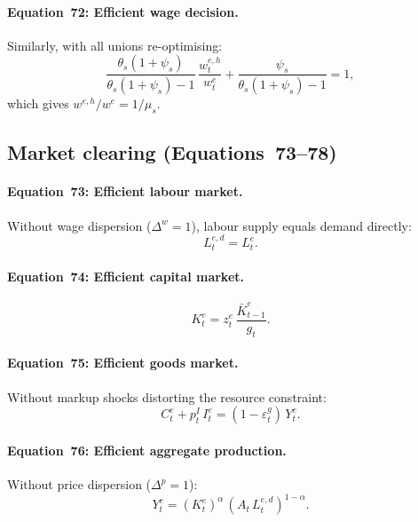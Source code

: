 \documentclass[11pt,a4paper]{article}
\newcommand{\bbar}[1]{\bar{#1}}
\begin{document}
\paragraph{Equation~72: Efficient wage decision.}
Similarly, with all unions re-optimising:
\begin{equation}\tag{Eq.~72}
  \frac{\theta_s(1+\psi_s)}{\theta_s(1+\psi_s)-1}\,
  \frac{w^{e,h}_t}{w^e_t}
  + \frac{\psi_s}{\theta_s(1+\psi_s)-1}
  = 1,
\end{equation}
which gives $w^{e,h}/w^e = 1/\mu_s$.

\subsection{Market clearing (Equations~73--78)}

\paragraph{Equation~73: Efficient labour market.}
Without wage dispersion ($\Delta^w = 1$), labour supply equals demand directly:
\begin{equation}\tag{Eq.~73}
  L^{e,d}_t = L^e_t.
\end{equation}

\paragraph{Equation~74: Efficient capital market.}
\begin{equation}\tag{Eq.~74}
  K^e_t = z^e_t\,\frac{\bbar K^e_{t-1}}{g_t}.
\end{equation}

\paragraph{Equation~75: Efficient goods market.}
Without markup shocks distorting the resource constraint:
\begin{equation}\tag{Eq.~75}
  C^e_t + p^I_t\,I^e_t = (1 - \varepsilon^g_t)\,Y^e_t.
\end{equation}

\paragraph{Equation~76: Efficient aggregate production.}
Without price dispersion ($\Delta^p = 1$):
\begin{equation}\tag{Eq.~76}
  Y^e_t = (K^e_t)^{\alpha}\,(A_t\,L^{e,d}_t)^{1-\alpha}.
\end{equation}
\end{document}
